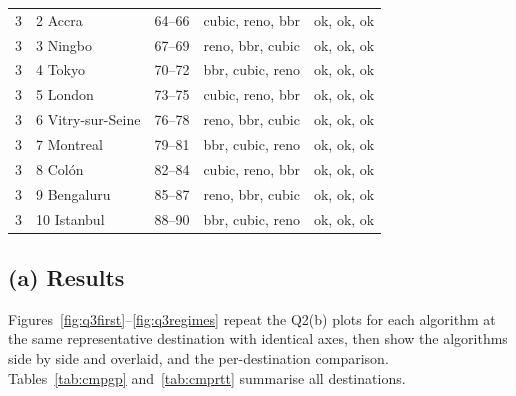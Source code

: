 \documentclass[10pt]{article}
\begin{document}
\begin{center}
\begin{longtable}{@{}rlrll@{}}
3 & 2 Accra & 64--66 & cubic, reno, bbr & ok, ok, ok \\
3 & 3 Ningbo & 67--69 & reno, bbr, cubic & ok, ok, ok \\
3 & 4 Tokyo & 70--72 & bbr, cubic, reno & ok, ok, ok \\
3 & 5 London & 73--75 & cubic, reno, bbr & ok, ok, ok \\
3 & 6 Vitry-sur-Seine & 76--78 & reno, bbr, cubic & ok, ok, ok \\
3 & 7 Montreal & 79--81 & bbr, cubic, reno & ok, ok, ok \\
3 & 8 Colón & 82--84 & cubic, reno, bbr & ok, ok, ok \\
3 & 9 Bengaluru & 85--87 & reno, bbr, cubic & ok, ok, ok \\
3 & 10 Istanbul & 88--90 & bbr, cubic, reno & ok, ok, ok \\
\bottomrule
\end{longtable}
\end{center}

\subsection{(a) Results}

Figures~\ref{fig:q3first}--\ref{fig:q3regimes} repeat the Q2(b) plots for each algorithm at the same representative destination with identical axes, then show the algorithms side by side and overlaid, and the per-destination comparison. Tables~\ref{tab:cmpgp} and~\ref{tab:cmprtt} summarise all destinations.
\end{document}
